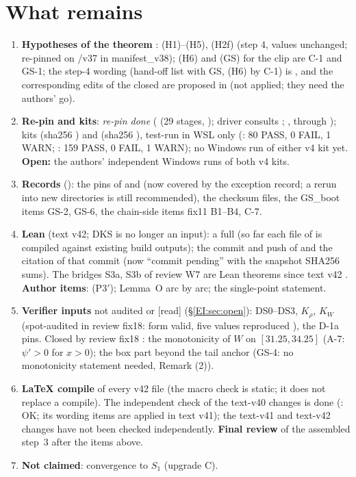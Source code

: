 \documentclass[11pt]{article}
\begin{document}
\section{What remains}\label{M:sec:remains}
\begin{enumerate}[leftmargin=*]
\item \textbf{Hypotheses of the theorem} \tH: (H1)--(H5), (H2f) (step 4, values unchanged; re-pinned on /v37 in manifest\_v38); (H6) and (GS) for the clip are C-1 and GS-1; the step-4 wording (hand-off list with GS, (H6) by C-1) is , and the corresponding edits of the closed  are proposed in  (not applied; they need the authors' go).
\item \textbf{Re-pin and kits}: \emph{re-pin done} ( (29 stages, ); driver  consults ; ,  through ); kits  (sha256 ) and  (sha256 ), test-run in WSL only (: 80 PASS, 0 FAIL, 1 WARN; : 159 PASS, 0 FAIL, 1 WARN); no Windows run of either v4 kit yet. \textbf{Open:} the authors' independent Windows runs of both v4 kits.
\item \textbf{Records} (): the pins of  and  (now covered by the exception record; a rerun into new directories is still recommended), the checksum files, the GS\_boot items GS-2, GS-6, the chain-side items fix11 B1--B4, C-7.
\item \textbf{Lean} (text v42; DKS is no longer an input): a full  (so far each file of  is compiled against existing build outputs); the commit and push of  and the citation of that commit (now ``commit pending'' with the snapshot SHA256 sums). The bridges S3a, S3b of review W7 are Lean theorems since text v42 \LeanSthree. \textbf{Author items}: (P3$'$); Lemma~O arc by arc; the single-point statement.
\item \textbf{Verifier inputs} not audited or [read] (\S\ref{EI:sec:open}): DS0--DS3, $K_\rho$, $K_W$ (spot-audited in review fix18: form valid, five values reproduced \tHd), the D-1a pins. Closed by review fix18 \tHd: the monotonicity of $W$ on $[31.25,34.25]$ (A-7: $\psi'>0$ for $x>0$); the box part beyond the tail anchor (GS-4: no monotonicity statement needed,  Remark (2)).
\item \textbf{LaTeX compile} of every v42 file (the macro check is static; it does not replace a compile). The independent check of the text-v40 changes is done (: OK; its wording items are applied in text v41); the text-v41 and text-v42 changes have not been checked independently. \textbf{Final review} of the assembled step~3 after the items above.
\item \textbf{Not claimed}: convergence to $S_1$ (upgrade C).
\end{enumerate}
\end{document}
